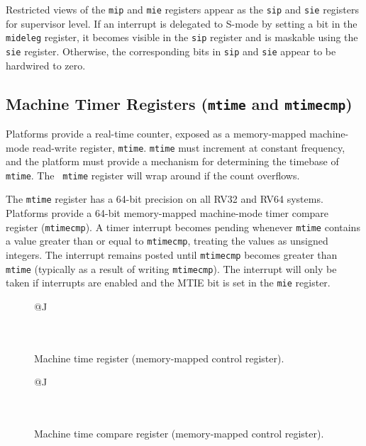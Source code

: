 Restricted views of the {\tt mip} and {\tt mie} registers appear as
the {\tt sip} and {\tt sie} registers for supervisor level.
If an interrupt is delegated to
S-mode by setting a bit in the {\tt mideleg} register,
it becomes visible in the {\tt sip} register and is maskable
using the {\tt sie} register.  Otherwise, the corresponding
bits in {\tt sip} and {\tt sie} appear to be hardwired
to zero.

\subsection{Machine Timer Registers ({\tt mtime} and {\tt mtimecmp})}

Platforms provide a real-time counter, exposed as a memory-mapped
machine-mode read-write register, {\tt mtime}.  {\tt mtime} must
increment at constant frequency, and the platform must provide a
mechanism for determining the timebase of {\tt mtime}.  The {\tt
  mtime} register will wrap around if the count overflows.

The {\tt mtime} register has a 64-bit precision on all RV32 and RV64
systems.  Platforms provide a 64-bit memory-mapped machine-mode
timer compare register ({\tt mtimecmp}).
A timer interrupt becomes pending whenever {\tt mtime} contains
a value greater than or equal to {\tt mtimecmp}, treating the values
as unsigned integers.
The interrupt remains posted until {\tt mtimecmp} becomes greater than
{\tt mtime} (typically as a result of writing {\tt mtimecmp}).
The interrupt will only be taken if interrupts
are enabled and the MTIE bit is set in the {\tt mie} register.

\begin{figure}[h!]
{\footnotesize
\begin{center}
\begin{tabular}{@{}J}
 \\
\hline
{} \\
 \\
\end{tabular}
\end{center}
}
\vspace{-0.1in}
\caption{Machine time register (memory-mapped control register).}
\end{figure}

\begin{figure}[h!]
{\footnotesize
\begin{center}
\begin{tabular}{@{}J}
 \\
\hline
{} \\
 \\
\end{tabular}
\end{center}
}
\vspace{-0.1in}
\caption{Machine time compare register (memory-mapped control register).}
\end{figure}

